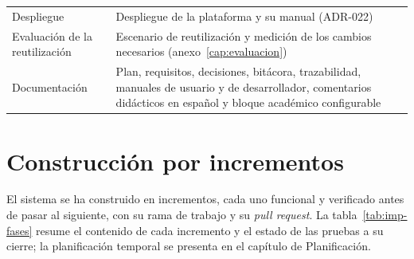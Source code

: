 \begin{longtable}{@{}>{\raggedright\arraybackslash}p{4.2cm}>{\raggedright\arraybackslash}p{10.0cm}@{}}
  Despliegue & Despliegue de la plataforma y su manual (ADR-022) \\
  Evaluación de la reutilización & Escenario de reutilización y medición de los cambios necesarios (anexo~\ref{cap:evaluacion}) \\
  Documentación & Plan, requisitos, decisiones, bitácora, trazabilidad, manuales de usuario y de desarrollador, comentarios didácticos en español y bloque académico configurable \\
\end{longtable}

\section{Construcción por incrementos}
\label{sec:imp-fases}

El sistema se ha construido en incrementos, cada uno funcional y verificado
antes de pasar al siguiente, con su rama de trabajo y su
\textit{pull request}. La tabla~\ref{tab:imp-fases} resume el contenido de
cada incremento y el estado de las pruebas a su cierre; la planificación
temporal se presenta en el capítulo de Planificación.


